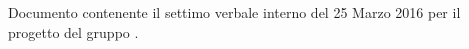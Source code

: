 Documento contenente il settimo verbale interno del 25 Marzo 2016 per il progetto \progetto{} del gruppo \gruppo{}.
